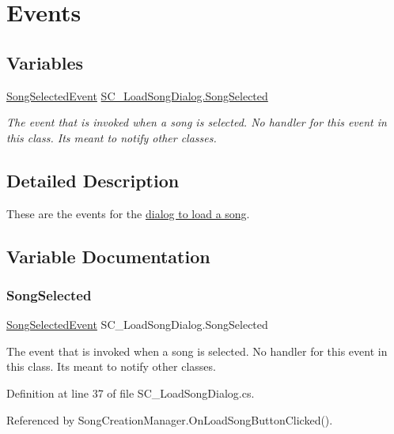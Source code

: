 \hypertarget{group___s_c___l_s_d_events}{}\section{Events}
\label{group___s_c___l_s_d_events}
\subsection*{Variables}
\begin{DoxyCompactItemize}
\item 
\hyperlink{group___s_c___l_s_d_event_types_class_s_c___load_song_dialog_1_1_song_selected_event}{Song\+Selected\+Event} \hyperlink{group___s_c___l_s_d_events_ga48d606b2c8291fee822dcc2b14ddcecc}{S\+C\+\_\+\+Load\+Song\+Dialog.\+Song\+Selected}
\begin{DoxyCompactList}\small\item\em The event that is invoked when a song is selected. No handler for this event in this class. It\textquotesingle{}s meant to notify other classes. \end{DoxyCompactList}\end{DoxyCompactItemize}


\subsection{Detailed Description}
These are the events for the \hyperlink{group___doc_s_c___l_s_d}{dialog to load a song}. 

\subsection{Variable Documentation}
\mbox{\label{group___s_c___l_s_d_events_ga48d606b2c8291fee822dcc2b14ddcecc}} 
\subsubsection{\texorpdfstring{Song\+Selected}{SongSelected}}
{\footnotesize\ttfamily \hyperlink{group___s_c___l_s_d_event_types_class_s_c___load_song_dialog_1_1_song_selected_event}{Song\+Selected\+Event} S\+C\+\_\+\+Load\+Song\+Dialog.\+Song\+Selected}



The event that is invoked when a song is selected. No handler for this event in this class. It\textquotesingle{}s meant to notify other classes. 



Definition at line 37 of file S\+C\+\_\+\+Load\+Song\+Dialog.\+cs.



Referenced by Song\+Creation\+Manager.\+On\+Load\+Song\+Button\+Clicked().

